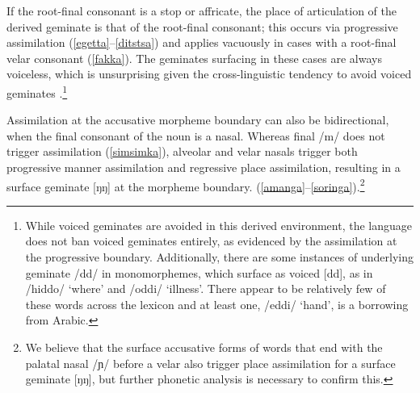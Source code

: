 \documentclass[output=paper]{langscibook}
\begin{document}
If the root-final consonant is a stop or affricate, the place of articulation of the derived geminate is that of the root-final consonant; this occurs via progressive assimilation (\ref{egetta}--\ref{ditstsa}) and applies vacuously in cases with a root-final velar consonant (\ref{fakka}). The geminates surfacing in these cases are always voiceless, which is unsurprising given the cross-linguistic tendency to avoid voiced geminates \citep{ohala}.\footnote{While voiced geminates are avoided in this derived environment, the language does not ban voiced geminates entirely, as evidenced by the assimilation at the progressive boundary. Additionally, there are some instances of underlying geminate /dd/ in monomorphemes, which surface as voiced [dd], as in /hiddo/ `where' and /oddi/ `illness'. There appear to be relatively few of these words across the lexicon and at least one, /eddi/ `hand', is a borrowing from Arabic.} 

Assimilation at the accusative morpheme boundary can also be bidirectional, when the final consonant of the noun is a nasal. Whereas final /m/ does not trigger assimilation (\ref{simsimka}), alveolar and velar nasals trigger both progressive manner assimilation and regressive place assimilation, resulting in a surface geminate [ŋŋ] at the morpheme boundary. (\ref{amanga}--\ref{soringa}).\footnote{We believe that the surface accusative forms of words that end with the palatal nasal /ɲ/ before a velar also trigger place assimilation for a surface geminate [ŋŋ], but further phonetic analysis is necessary to confirm this.}

\end{document}
